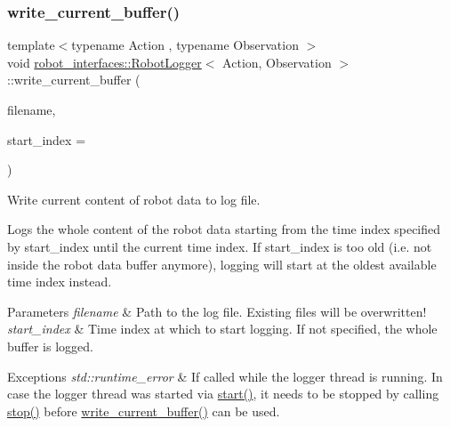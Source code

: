 \subsubsection{\texorpdfstring{write\+\_\+current\+\_\+buffer()}{write\_current\_buffer()}}
{\footnotesize\ttfamily template$<$typename Action , typename Observation $>$ \\
void \hyperlink{classrobot__interfaces_1_1RobotLogger}{robot\+\_\+interfaces\+::\+Robot\+Logger}$<$ Action, Observation $>$\+::write\+\_\+current\+\_\+buffer (\begin{DoxyParamCaption}\item[{const std\+::string}]{filename,  }\item[{long int}]{start\+\_\+index = {} }\end{DoxyParamCaption})\hspace{0.3cm}{\ttfamily [inline]}}



Write current content of robot data to log file. 

Logs the whole content of the robot data starting from the time index specified by {\ttfamily start\+\_\+index} until the current time index. If {\ttfamily start\+\_\+index} is too old (i.\+e. not inside the robot data buffer anymore), logging will start at the oldest available time index instead.


\begin{DoxyParams}{Parameters}
{\em filename} & Path to the log file. Existing files will be overwritten! \\
\hline
{\em start\+\_\+index} & Time index at which to start logging. If not specified, the whole buffer is logged. \\
\hline
\end{DoxyParams}

\begin{DoxyExceptions}{Exceptions}
{\em std\+::runtime\+\_\+error} & If called while the logger thread is running. In case the logger thread was started via {\ttfamily \hyperlink{classrobot__interfaces_1_1RobotLogger_a7a1b50c75aab3255ac7e6d412de833d1}{start()}}, it needs to be stopped by calling {\ttfamily \hyperlink{classrobot__interfaces_1_1RobotLogger_a55ec7dcacd849adee53fa49a2a0c8234}{stop()}} before {\ttfamily \hyperlink{classrobot__interfaces_1_1RobotLogger_ada7467fbac96a67ab798c4e6ef56c9b1}{write\+\_\+current\+\_\+buffer()}} can be used. \\
\hline
\end{DoxyExceptions}
\mbox{\label{classrobot__interfaces_1_1RobotLogger_a3ff864106933593e16e5f3d6b5a8c4c2}} 
